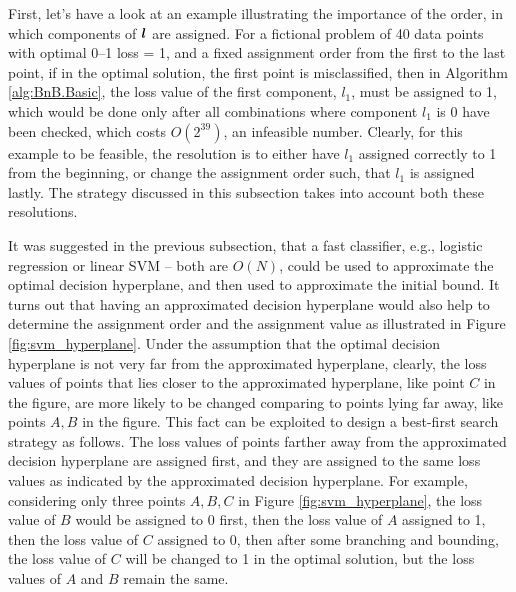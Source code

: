 First, let's have a look at an example illustrating the importance of the order, in which components of $\boldsymbol{l}$ are assigned. For a fictional problem of 40 data points with optimal 0--1 loss = 1, and a fixed assignment order from the first to the last point, if in the optimal solution, the first point is misclassified, then in Algorithm \ref{alg:BnB.Basic}, the loss value of the first component, $l_1$, must be assigned to 1, which would be done only after all combinations where component $l_1$ is $0$ have been checked, which costs $O(2^{39})$, an infeasible number. Clearly, for this example to be feasible,  the resolution is to either have $l_1$ assigned correctly to 1 from the beginning, or change the assignment order such, that $l_1$ is assigned lastly. The strategy discussed in this subsection takes into account both these resolutions.

It was suggested in the previous subsection, that a fast classifier, e.g., logistic regression or linear SVM -- both are $O(N)$, could be used to approximate the optimal decision hyperplane, and then used to approximate the initial bound. It turns out that having an approximated decision hyperplane would also help to determine the assignment order and the assignment value as illustrated in Figure \ref{fig:svm_hyperplane}. Under the assumption that the optimal decision hyperplane is not very far from the approximated hyperplane, clearly, the loss values of points that lies closer to the approximated hyperplane, like point $C$ in the figure, are more likely to be changed comparing to points lying far away, like points $A, B$ in the figure. This fact can be exploited to design a best-first search strategy as follows. The loss values of points farther away from the approximated decision hyperplane are assigned first, and they are assigned to the same loss values as indicated by the approximated decision hyperplane. For example, considering only three points $A, B, C$ in Figure \ref{fig:svm_hyperplane}, the loss value of $B$ would be assigned to 0 first, then the loss value of $A$ assigned to 1, then the loss value of $C$ assigned to 0, then after some branching and bounding, the loss value of $C$ will be changed to 1 in the optimal solution, but the loss values of $A$ and $B$ remain the same.

